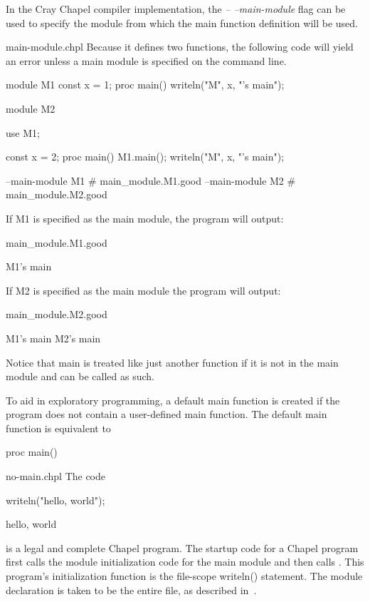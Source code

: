 \begin{craychapel}
In the Cray Chapel compiler implementation, the \emph{--
--main-module} flag can be used to specify the module from which the
main function definition will be used.
\end{craychapel}

\begin{chapelexample}{main-module.chpl}
Because it defines two  functions, the following code will yield an
error unless a main module is specified on the command line.
\begin{chapel}
module M1 {
  const x = 1;
  proc main() {
    writeln("M", x, "'s main");
  }
}
 
module M2 {
  use M1;

  const x = 2;
  proc main() {
    M1.main();
    writeln("M", x, "'s main");
  }
}
\end{chapel}
\begin{chapelcompopts}
--main-module M1 \# main\_module.M1.good
--main-module M2 \# main\_module.M2.good
\end{chapelcompopts}
If M1 is specified as the main module, the program will output:
\begin{chapeloutputname}
main_module.M1.good
\end{chapeloutputname}
\begin{chapelprintoutput}
M1's main
\end{chapelprintoutput}
If M2 is specified as the main module the program will output:
\begin{chapeloutputname}
main_module.M2.good
\end{chapeloutputname}
\begin{chapelprintoutput}
M1's main
M2's main
\end{chapelprintoutput}
Notice that main is treated like just another function if it is not in
the main module and can be called as such.
\end{chapelexample}



To aid in exploratory programming, a default main function is
created if the program does not contain a user-defined main function.  The
default main function is equivalent to
\begin{chapel}
proc main() {}
\end{chapel}

\begin{chapelexample}{no-main.chpl}
The code
\begin{chapel}
writeln("hello, world");
\end{chapel}
\begin{chapeloutput}
hello, world
\end{chapeloutput}
is a legal and complete Chapel program.  The startup code for a Chapel program
first calls the module initialization code for the main module and then
calls .  This program's initialization function is the file-scope
writeln() statement.  The module declaration is taken to be the entire file,
as described in~.
\end{chapelexample}


